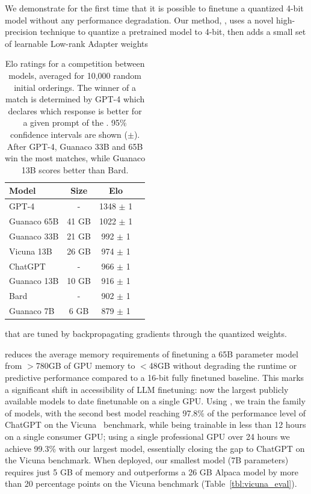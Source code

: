 We demonstrate for the first time that it is possible to finetune a quantized 4-bit model without any performance degradation. Our method, \method, uses a novel high-precision technique to quantize a pretrained model to 4-bit, 
then adds a small set of learnable Low-rank Adapter weights \citep{hu2021lora} 
\begin{table}
\centering
\vspace{-5pt}
\caption{Elo ratings for a competition between models, averaged for 10,000 random initial orderings. The winner of a match is determined by GPT-4 which declares which response is better for a given prompt of the \benchv. 95\% confidence intervals are shown ($\pm$). After GPT-4, Guanaco 33B and 65B win the most matches, while Guanaco 13B scores better than Bard.}
\label{tbl:elo}
\begin{tabular}{lccr}\toprule
Model & Size & Elo \\\midrule
GPT-4 & - & 1348 $\pm$ 1 \\
Guanaco 65B & 41 GB & 1022 $\pm$ 1 \\
Guanaco 33B & 21 GB & \hspace{1.75mm}992 $\pm$ 1 \\
Vicuna 13B & 26 GB & \hspace{1.75mm}974 $\pm$  1\\
ChatGPT & - & \hspace{1.75mm}966  $\pm$ 1 \\
Guanaco 13B & 10 GB & \hspace{1.75mm}916 $\pm$ 1 \\
Bard & - & \hspace{1.75mm}902 $\pm$ 1 \\
Guanaco 7B & 6 GB & \hspace{1.75mm}879 $\pm$ 1\\\bottomrule
\end{tabular}
\vspace{-10pt}
\end{table}
that are tuned by backpropagating gradients through the quantized weights. 

\method reduces the average memory requirements of finetuning a 65B parameter model from $>$780GB of GPU memory to $<$48GB without degrading the runtime or predictive performance compared to a 16-bit fully finetuned baseline.
This marks a significant shift in accessibility of LLM finetuning: now the largest publicly available models to date finetunable on a single GPU.
Using \method, we train the \bfmodel family of models, with the second best model reaching 97.8\% of the performance level of ChatGPT on the Vicuna~\citep{vicuna2023} benchmark, while being trainable in less than 12 hours on a single consumer GPU; using a single professional GPU over 24 hours we achieve 99.3\% with our largest model, essentially closing the gap to ChatGPT on the Vicuna benchmark. When deployed, our smallest \bfmodel model (7B parameters) requires just 5 GB of memory and outperforms a 26 GB Alpaca model by more than 20 percentage points on the Vicuna benchmark (Table~\ref{tbl:vicuna_eval}).



